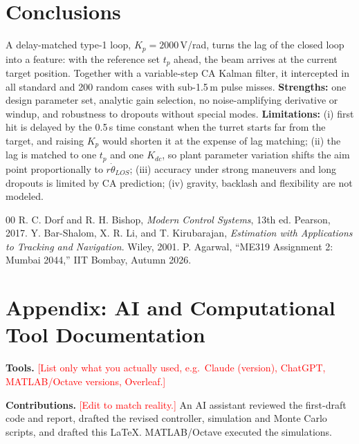 \documentclass[10pt, conference]{IEEEtran}
\newcommand{\todo}[1]{\textcolor{red}{[#1]}}
\begin{document}
\section{Conclusions}
A delay-matched type-1 loop, $K_p=2000$\,V/rad, turns the lag of the closed loop into a feature: with the reference set $t_p$ ahead, the beam arrives at the current target position. Together with a variable-step CA Kalman filter, it intercepted in all standard and 200 random cases with sub-1.5\,m pulse misses.
\textbf{Strengths:} one design parameter set, analytic gain selection, no noise-amplifying derivative or windup, and robustness to dropouts without special modes.
\textbf{Limitations:} (i) first hit is delayed by the 0.5\,s time constant when the turret starts far from the target, and raising $K_p$ would shorten it at the expense of lag matching; (ii) the lag is matched to one $t_p$ and one $K_{dc}$, so plant parameter variation shifts the aim point proportionally to $r\dot\theta_{LOS}$; (iii) accuracy under strong maneuvers and long dropouts is limited by CA prediction; (iv) gravity, backlash and flexibility are not modeled.

\begin{thebibliography}{00}
 R. C. Dorf and R. H. Bishop, \textit{Modern Control Systems}, 13th ed. Pearson, 2017.
 Y. Bar-Shalom, X. R. Li, and T. Kirubarajan, \textit{Estimation with Applications to Tracking and Navigation}. Wiley, 2001.
 P. Agarwal, ``ME319 Assignment 2: Mumbai 2044,'' IIT Bombay, Autumn 2026.
\end{thebibliography}

\clearpage
\section*{Appendix: AI and Computational Tool Documentation}
\small
\textbf{Tools.} \todo{List only what you actually used, e.g.\ Claude (version), ChatGPT, MATLAB/Octave versions, Overleaf.}

\textbf{Contributions.} \todo{Edit to match reality.} An AI assistant reviewed the first-draft code and report, drafted the revised controller, simulation and Monte Carlo scripts, and drafted this LaTeX. MATLAB/Octave executed the simulations.
\end{document}
